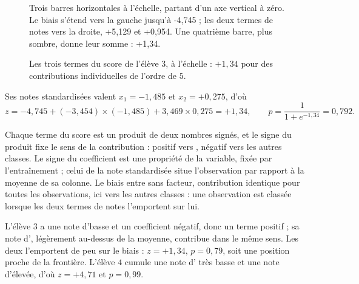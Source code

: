 \begin{figure}[htbp]
\centering
\begin{graphique}{Trois barres horizontales à l'échelle, partant d'un axe vertical à zéro. Le biais s'étend vers la gauche jusqu'à -4,745 ; les deux termes de notes vers la droite, +5,129 et +0,954. Une quatrième barre, plus sombre, donne leur somme : +1,34.}
\end{graphique}
\caption{Les trois termes du score de l'élève $3$, à l'échelle : $+1{,}34$ pour
des contributions individuelles de l'ordre de $5$.}
\label{fig:contributions}
\end{figure}
\FloatBarrier

\begin{releve}
Ses notes standardisées valent $x_1=-1{,}485$ et $x_2=+0{,}275$, d'où
\[
  z=-4{,}745+(-3{,}454)\times(-1{,}485)+3{,}469\times0{,}275=+1{,}34,
  \qquad
  p=\frac{1}{1+e^{-1{,}34}}=0{,}792 .
\]
\end{releve}

Chaque terme du score est un produit de deux nombres signés, et le signe du
produit fixe le sens de la contribution : positif vers \Gryf, négatif vers les
autres classes. Le signe du coefficient est une propriété de la variable, fixée
par l'entraînement ; celui de la note standardisée situe l'observation par
rapport à la moyenne de sa colonne. Le biais entre sans facteur, contribution
identique pour toutes les observations, ici vers les autres classes : une
observation est classée \Gryf lorsque les deux termes de notes l'emportent sur
lui.

L'élève $3$ a une note d'\Herb basse et un coefficient négatif, donc un terme
positif ; sa note d'\Runes, légèrement au-dessus de la moyenne, contribue dans le
même sens. Les deux l'emportent de peu sur le biais : $z=+1{,}34$, $p=0{,}79$,
soit une position proche de la frontière. L'élève $4$ cumule une note d'\Herb
très basse et une note d'\Runes élevée, d'où $z=+4{,}71$ et $p=0{,}99$.

